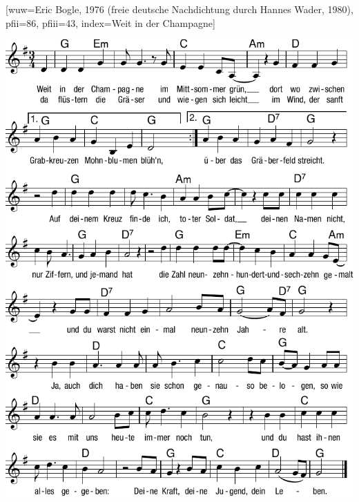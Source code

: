 [wuw={Eric Bogle, 1976 (freie deutsche Nachdichtung durch Hannes Wader, 1980)}, pfii={86}, pfiii={43}, index={Weit in der Champagne}]

\markboth{\songtitle}{\songtitle}

\beginverse
\endverse
\centering\includegraphics[width=1\textwidth]{Noten/Lied036.pdf}	



